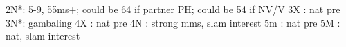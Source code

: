 2N*: 5-9, 55ms+; could be 64 if partner PH; could be 54 if NV/V
3X : nat pre
3N*: gambaling
4X : nat pre
4N : strong mms, slam interest
5m : nat pre
5M : nat, slam interest
